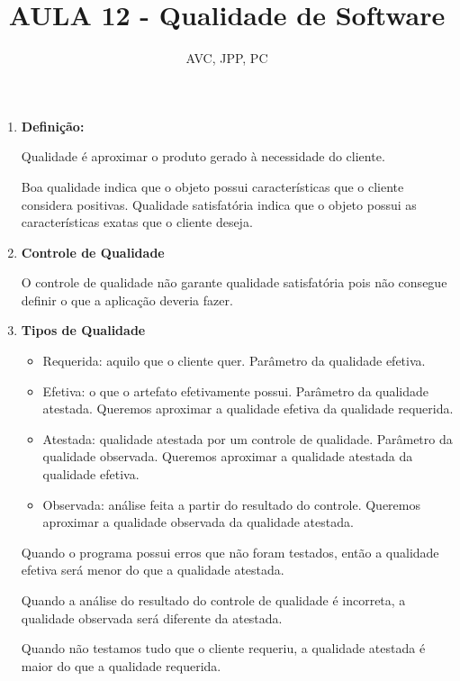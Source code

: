 \documentclass[
	12pt, %
]{fphw}
\title{AULA 12 - Qualidade de Software} %
\author{AVC, JPP, PC} %
\date{} %
\institute{Pontifícia Universidade Católica do Rio de Janeiro \\ Departamento de Informática} %
\begin{document}
\maketitle %

\begin{doublespace}

    \begin{enumerate}[label=\textbf{\arabic*)}]

        \item \textbf{Definição:}

              Qualidade é aproximar o produto gerado à necessidade do cliente.

              Boa qualidade indica que o objeto possui características que o cliente considera positivas. Qualidade satisfatória indica que o objeto possui as características exatas que o cliente deseja.

        \item \textbf{Controle de Qualidade}

              O controle de qualidade não garante qualidade satisfatória pois não consegue definir o que a aplicação deveria fazer.

        \item \textbf{Tipos de Qualidade}

              \begin{itemize}

                  \item Requerida: aquilo que o cliente quer. Parâmetro da qualidade efetiva.
                  \item Efetiva: o que o artefato efetivamente possui. Parâmetro da qualidade atestada. Queremos aproximar a qualidade efetiva da qualidade requerida.
                  \item Atestada: qualidade atestada por um controle de qualidade. Parâmetro da qualidade observada. Queremos aproximar a qualidade atestada da qualidade efetiva.
                  \item Observada: análise feita a partir do resultado do controle. Queremos aproximar a qualidade observada da qualidade atestada.

              \end{itemize}

              Quando o programa possui erros que não foram testados, então a qualidade efetiva será menor do que a qualidade atestada.

              Quando a análise do resultado do controle de qualidade é incorreta, a qualidade observada será diferente da atestada.

              Quando não testamos tudo que o cliente requeriu, a qualidade atestada é maior do que a qualidade requerida.


    \end{enumerate}


\end{doublespace}
\end{document}
